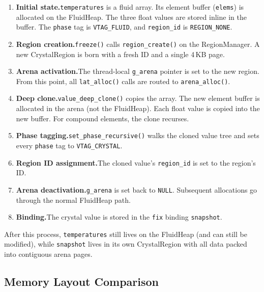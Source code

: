 \begin{enumerate}
  \item \textbf{Initial state.}\quad \lstinline|temperatures| is a fluid array.
  Its element buffer (\lstinline|elems|) is allocated on the FluidHeap.
  The three float values are stored inline in the buffer.
  The \lstinline|phase| tag is \lstinline|VTAG_FLUID|, and \lstinline|region_id| is \lstinline|REGION_NONE|.

  \item \textbf{Region creation.}\quad \lstinline|freeze()| calls \lstinline|region_create()| on the RegionManager.
  A new CrystalRegion is born with a fresh ID and a single 4\,KB page.

  \item \textbf{Arena activation.}\quad The thread-local \lstinline|g_arena| pointer is set to the new region.
  From this point, all \lstinline|lat_alloc()| calls are routed to \lstinline|arena_alloc()|.

  \item \textbf{Deep clone.}\quad \lstinline|value_deep_clone()| copies the array.
  The new element buffer is allocated in the arena (not the FluidHeap).
  Each float value is copied into the new buffer.
  For compound elements, the clone recurses.

  \item \textbf{Phase tagging.}\quad \lstinline|set_phase_recursive()| walks the cloned value tree and sets every \lstinline|phase| tag to \lstinline|VTAG_CRYSTAL|.

  \item \textbf{Region ID assignment.}\quad The cloned value's \lstinline|region_id| is set to the region's ID.

  \item \textbf{Arena deactivation.}\quad \lstinline|g_arena| is set back to \lstinline|NULL|.
  Subsequent allocations go through the normal FluidHeap path.

  \item \textbf{Binding.}\quad The crystal value is stored in the \lstinline|fix| binding \lstinline|snapshot|.
\end{enumerate}

After this process, \lstinline|temperatures| still lives on the FluidHeap (and can still be modified), while \lstinline|snapshot| lives in its own CrystalRegion with all data packed into contiguous arena pages.

\subsection{Memory Layout Comparison}

